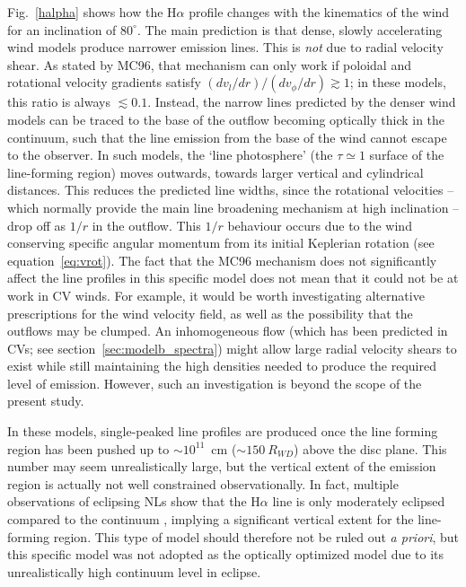 Fig.~\ref{halpha} shows how the H$\alpha$ profile changes with the kinematics of the wind for 
an inclination of $80^\circ$. The main prediction is that dense, slowly accelerating 
wind models produce narrower emission lines. This is {\em not} due to radial 
velocity shear. As stated by MC96, that mechanism can only work if poloidal 
and rotational velocity gradients satisfy $(dv_l/dr)/(dv_\phi/dr) \gtrsim 1$; in 
these models, this ratio is always $\lesssim 0.1$. Instead, the narrow lines predicted 
by the denser wind models can be traced to the base of the outflow becoming optically 
thick in the continuum, such that the line emission from the base of the wind
cannot escape to the observer. In such models, the `line photosphere'
(the $\tau \simeq 1$ surface of the line-forming region) moves outwards, towards larger 
vertical and cylindrical distances. This reduces the predicted line widths, since the 
rotational velocities -- which normally provide the main line broadening mechanism at 
high inclination -- drop off as $1/r$ in the outflow. This $1/r$ behaviour occurs due to the wind
conserving specific angular momentum from its initial Keplerian rotation 
(see equation~\ref{eq:vrot}). The fact that the MC96 
mechanism does not significantly affect the line profiles in this specific model 
does not mean that it could not be at work in CV winds. For example, it would be worth investigating
alternative prescriptions for the wind velocity field, as well as the possibility that the 
outflows may be clumped. An inhomogeneous flow 
(which has been predicted in CVs; see section~\ref{sec:modelb_spectra})
might allow large radial velocity shears to exist while still 
maintaining the high densities needed to produce the required level of emission.
However, such an investigation is beyond the scope of the present study.

In these models, single-peaked line profiles are produced once the line forming region 
has been
pushed up to $\sim 10^{11}$~cm ($\sim150~R_{WD}$) above the disc plane. 
This number may seem unrealistically large, but the vertical extent of 
the emission region is actually not well constrained observationally. 
In fact, multiple observations of eclipsing NLs show that the H$\alpha$ 
line is only moderately eclipsed compared to the continuum 
\citep[e.g.][see also section~\ref{sec:rwtri}]{baptista2000,groot2004}, 
implying a significant vertical extent for the line-forming 
region. This type of model should therefore not be ruled out {\em a priori}, 
but this specific model was not adopted as the optically optimized model
due to its unrealistically high continuum level in eclipse. 

